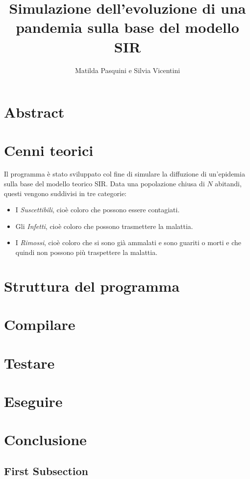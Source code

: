 \documentclass[12pt, a4paper]{article} %
\title{Simulazione dell'evoluzione di una pandemia sulla base del modello SIR}
\author{Matilda Pasquini e Silvia Vicentini}
\begin{document}
\maketitle
\section{Abstract}

\section{Cenni teorici}
Il programma \`{e} stato sviluppato col fine di simulare la diffuzione di un'epidemia sulla base del modello teorico SIR. Data una popolazione chiusa di $N$ abitandi, questi vengono suddivisi in tre categorie:
\begin{itemize}
\item I \textit{Suscettibili}, cio\`{e} coloro che possono essere contagiati.
\item Gli \textit{Infetti}, cio\`{e} coloro che possono trasmettere la malattia.
\item I \textit{Rimossi}, cio\`{e} coloro che si sono già ammalati e sono guariti o morti e che quindi non possono più traspettere la malattia.
\end{itemize}

\section{Struttura del programma}

\section{Compilare}
\section{Testare}  %
\section{Eseguire} %
\section{Conclusione}

\subsection{First Subsection} %
\end{document}
